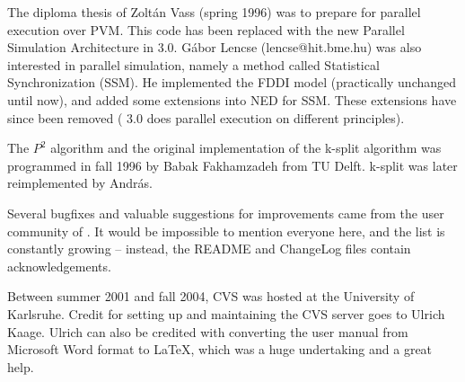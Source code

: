 The diploma thesis of Zolt\'{a}n Vass (spring 1996) was to prepare
{\omnetpp} for parallel execution over PVM. This code has been
replaced with the new Parallel Simulation Architecture in {\omnetpp} 3.0.
G\'{a}bor Lencse (lencse@hit.bme.hu) was also interested in parallel
simulation, namely a method called Statistical Synchronization (SSM).
He implemented the FDDI model (practically unchanged until now), and added
some extensions into NED for SSM. These extensions have since been removed
({\omnetpp} 3.0 does parallel execution on different principles).

The $P^{2}$ algorithm and the original implementation of the k-split algorithm
was programmed in fall 1996 by Babak Fakhamzadeh from TU Delft.
k-split was later reimplemented by Andr\'{a}s.

Several bugfixes and valuable suggestions for improvements came
from the user community of {\omnetpp}. It would be impossible to
mention everyone here, and the list is constantly growing --
instead, the README and ChangeLog files contain acknowledgements.

Between summer 2001 and fall 2004, {\omnetpp} CVS was hosted
at the University of Karlsruhe. Credit for setting
up and maintaining the CVS server goes to Ulrich Kaage.
Ulrich can also be credited with converting the user manual from
Microsoft Word format to LaTeX, which was a huge undertaking
and a great help.



